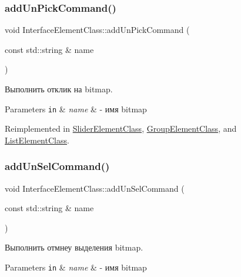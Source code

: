 \subsubsection{\texorpdfstring{add\+Un\+Pick\+Command()}{addUnPickCommand()}}
{\footnotesize\ttfamily void Interface\+Element\+Class\+::add\+Un\+Pick\+Command (\begin{DoxyParamCaption}\item[{const std\+::string \&}]{name }\end{DoxyParamCaption})\hspace{0.3cm}{\ttfamily [virtual]}}



Выполнить отклик на bitmap. 


\begin{DoxyParams}[1]{Parameters}
\mbox{\tt in}  & {\em name} & -\/ имя bitmap \\
\hline
\end{DoxyParams}


Reimplemented in \hyperlink{class_slider_element_class_a2844280cd2d938b7f96e5e9640de4d09}{Slider\+Element\+Class}, \hyperlink{class_group_element_class_a253deff7c95f9311405dc99ba0ffe7c2}{Group\+Element\+Class}, and \hyperlink{class_list_element_class_a0dc213a87089450f5b18297b6e56673e}{List\+Element\+Class}.

\mbox{\label{class_interface_element_class_a906729d7cf4a4db85520c8e516007685}} 
\subsubsection{\texorpdfstring{add\+Un\+Sel\+Command()}{addUnSelCommand()}}
{\footnotesize\ttfamily void Interface\+Element\+Class\+::add\+Un\+Sel\+Command (\begin{DoxyParamCaption}\item[{const std\+::string \&}]{name }\end{DoxyParamCaption})\hspace{0.3cm}{\ttfamily [virtual]}}



Выполнить отмнеу выделения bitmap. 


\begin{DoxyParams}[1]{Parameters}
\mbox{\tt in}  & {\em name} & -\/ имя bitmap \\
\hline
\end{DoxyParams}


